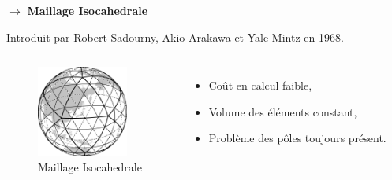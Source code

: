 \documentclass[11pt]{beamer}
\begin{document}
\begin{frame}
$\rightarrow$ \textbf{Maillage Isocahedrale}

Introduit par Robert Sadourny, Akio Arakawa et Yale Mintz en 1968.

\begin{columns}
\begin{figure}
\includegraphics[height=3cm]{isocahedral_grid.jpg}
\caption{Maillage Isocahedrale}
\end{figure}
\pause
{}
\begin{itemize}
\item Coût en calcul faible,
\item Volume des éléments constant,
\item Problème des pôles toujours présent.
\end{itemize}
\end{columns}
\end{frame}



\end{document}
